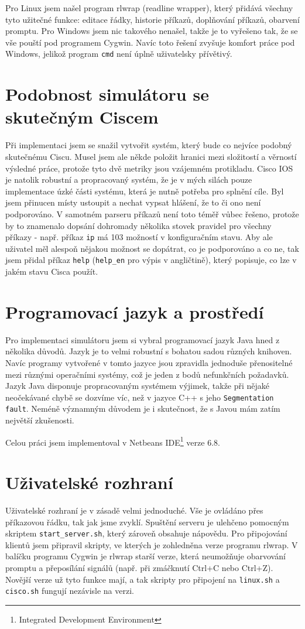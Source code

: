 Pro Linux jsem našel program rlwrap (readline wrapper), který přidává všechny tyto užitečné funkce: editace řádky, historie příkazů, doplňování příkazů, obarvení promptu. Pro Windows jsem nic takového nenašel, takže je to vyřešeno tak, že se vše pouští pod programem Cygwin. Navíc toto řešení zvyšuje komfort práce pod Windows, jelikož program \verb|cmd| není úplně uživatelsky přívětivý.


\section{Podobnost simulátoru se skutečným Ciscem}
Při implementaci jsem se snažil vytvořit systém, který bude co nejvíce podobný skutečnému Ciscu. Musel jsem ale někde položit hranici mezi složitostí a věrností výsledné práce, protože tyto dvě metriky jsou vzájemném protikladu. Cisco IOS je natolik robustní a propracovaný systém, že je v mých silách pouze implementace úzké části systému, která je nutně potřeba pro splnění cíle. Byl jsem přinucen místy ustoupit a nechat vypsat hlášení, že to či ono není podporováno. V samotném parseru příkazů není toto téměř vůbec řešeno, protože by to znamenalo dopsání dohromady několika stovek pravidel pro všechny příkazy - např. příkaz \verb|ip| má 103 možností v konfiguračním stavu. Aby ale uživatel měl alespoň nějakou možnost se dopátrat, co je podporováno a co ne, tak jsem přidal příkaz \verb|help| (\verb|help_en| pro výpis v angličtině), který popisuje, co lze v jakém stavu Cisca použít.


\section{Programovací jazyk a prostředí}
Pro implementaci simulátoru jsem si vybral programovací jazyk Java hned z několika důvodů. Jazyk je to velmi robustní s bohatou sadou různých knihoven. Navíc programy vytvořené v tomto jazyce jsou zpravidla jednoduše přenositelné mezi různými operačními systémy, což je jeden z bodů nefunkčních požadavků. Jazyk Java disponuje propracovaným systémem výjimek, takže při nějaké neočekávané chybě se dozvíme víc, než v jazyce C++ s jeho \verb|Segmentation fault|. Neméně významným důvodem je i skutečnost, že s Javou mám zatím největší zkušenosti.

Celou práci jsem implementoval v Netbeans IDE\footnote{Integrated Development Environment} verze 6.8.


\section{Uživatelské rozhraní}
Uživatelské rozhraní je v zásadě velmi jednoduché. Vše je ovládáno přes příkazovou řádku, tak jak jsme zvyklí. Spuštění serveru je ulehčeno pomocným skriptem \verb|start_server.sh|, který zároveň obsahuje nápovědu. Pro připojování klientů jsem připravil skripty, ve kterých je zohledněna verze programu rlwrap. V balíčku programu Cygwin je rlwrap starší verze, která neumožňuje obarvování promptu a přeposílání signálů (např. při zmáčknutí Ctrl+C nebo Ctrl+Z). Novější verze už tyto funkce mají, a tak skripty pro připojení na \verb|linux.sh| a \verb|cisco.sh| fungují nezávisle na verzi.


